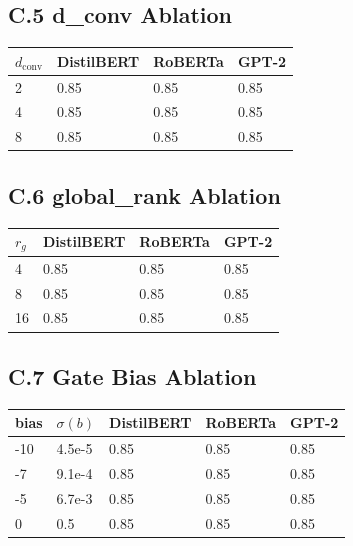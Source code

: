\subsection{C.5 d\_conv Ablation}

\begin{table}[H]
\centering
\small
\begin{tabular}{llll}
\toprule
\textbf{$d_\text{conv}$} & \textbf{DistilBERT} & \textbf{RoBERTa} & \textbf{GPT-2} \\
\midrule
2 & 0.85 & 0.85 & 0.85 \\
4 & 0.85 & 0.85 & 0.85 \\
8 & 0.85 & 0.85 & 0.85 \\
\bottomrule
\end{tabular}
\end{table}

\subsection{C.6 global\_rank Ablation}

\begin{table}[H]
\centering
\small
\begin{tabular}{llll}
\toprule
\textbf{$r_g$} & \textbf{DistilBERT} & \textbf{RoBERTa} & \textbf{GPT-2} \\
\midrule
4 & 0.85 & 0.85 & 0.85 \\
8 & 0.85 & 0.85 & 0.85 \\
16 & 0.85 & 0.85 & 0.85 \\
\bottomrule
\end{tabular}
\end{table}

\subsection{C.7 Gate Bias Ablation}

\begin{table}[H]
\centering
\small
\begin{tabular}{lllll}
\toprule
\textbf{bias} & \textbf{$\sigma(b)$} & \textbf{DistilBERT} & \textbf{RoBERTa} & \textbf{GPT-2} \\
\midrule
-10 & 4.5e-5 & 0.85 & 0.85 & 0.85 \\
-7 & 9.1e-4 & 0.85 & 0.85 & 0.85 \\
-5 & 6.7e-3 & 0.85 & 0.85 & 0.85 \\
0 & 0.5 & 0.85 & 0.85 & 0.85 \\
\bottomrule
\end{tabular}
\end{table}

